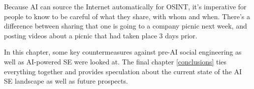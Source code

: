 Because AI can source the Internet automatically for OSINT, it's imperative for people to know to be careful of what they share, with whom and when. There's a difference between sharing that one is going to a company picnic next week, and posting videos about a picnic that had taken place 3 days prior.



In this chapter, some key countermeasures against pre-AI social engineering as well as AI-powered SE were looked at. The final chapter \ref{conclusions} ties everything together and provides speculation about the current state of the AI SE landscape as well as future prospects.

